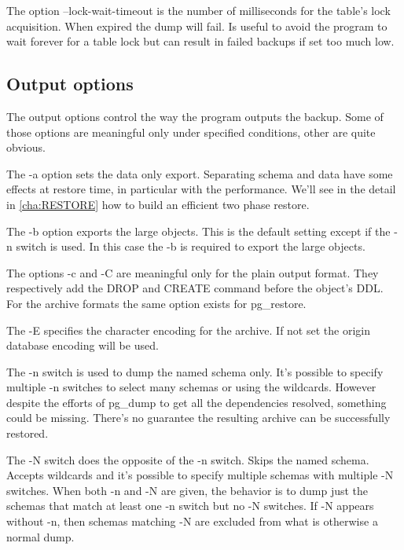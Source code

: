 The option --lock-wait-timeout is the number of milliseconds for the table's lock acquisition. 
When expired the dump will fail. Is useful to avoid the program to wait forever for a table lock 
but can result in failed backups if set too much low.

\subsection{Output options}
\label{sub:PGDUMPOUTPUT}
The output options control the way the program outputs the backup. Some of those options are 
meaningful only under specified conditions, other are quite obvious.\newline

The -a option sets the data only export. Separating schema and data have some effects at restore 
time, in particular with the performance. We'll see in the detail in \ref{cha:RESTORE} how to 
build an efficient two phase restore.\newline

The -b option exports the large objects. This is the default setting except if the -n switch is 
used. In this case the -b is required to export the large objects.\newline

The options -c and -C are meaningful only for the plain output format. They respectively add the 
DROP and CREATE command before the object's DDL. For the archive formats the same option exists for 
pg\_restore.\newline

The -E specifies the character encoding for the archive. If not set the origin database encoding 
will be used.\newline 

The -n switch is used to dump the named schema only. It's possible to specify multiple -n switches 
to select many schemas or using the wildcards. However despite the efforts of pg\_dump to get all 
the dependencies resolved, something could be missing. There's no guarantee the resulting archive 
can be successfully restored.\newline

The -N switch does the opposite of the -n switch. Skips the named schema. Accepts wildcards and 
it's possible to specify multiple schemas with multiple -N switches. When both -n and -N are given, 
the behavior is to dump just the schemas that match at least one -n switch but no -N switches. If -N 
appears without -n, then schemas matching -N are excluded from what is otherwise a normal 
dump.\newline


